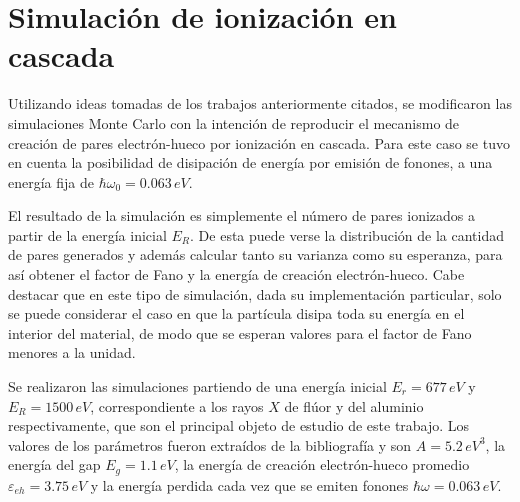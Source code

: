 \section{Simulación de ionización en cascada}
\noindent Utilizando ideas tomadas de los trabajos anteriormente citados, se modificaron las simulaciones Monte Carlo con la intención de reproducir el mecanismo de creación de pares electrón-hueco por ionización en cascada. Para este caso se tuvo en cuenta la posibilidad de disipación de energía por emisión de fonones, a una energía fija de $\hbar\omega_{0} = 0.063\,\si{eV}$.

El resultado de la simulación es simplemente el número de pares 
ionizados a partir de la energía inicial $E_{R}$. De esta puede verse la distribución de la cantidad de pares generados y además calcular tanto su varianza como su esperanza, para así obtener el factor de Fano y la energía de creación electrón-hueco.
Cabe destacar que en este tipo de simulación, dada su implementación particular, solo se puede considerar el caso en que la partícula disipa toda su energía en el interior del material, de modo que se esperan valores para el factor de Fano menores a la unidad.

Se realizaron las simulaciones partiendo de una energía inicial $E_{r} = 677\,\si{eV}$ y $E_{R} = 1500\,\si{eV}$, correspondiente a los rayos $X$ de flúor y del aluminio respectivamente, que son el principal objeto de estudio de este trabajo. Los valores de los parámetros fueron extraídos de la bibliografía\cite{Alig, Ramanathan} y son $A = 5.2\,\si{eV}^{3}$, la energía del gap $E_{g} = 1.1\,\si{eV}$, la energía de creación electrón-hueco promedio $\varepsilon_{eh} = 3.75\,\si{eV}$ y la energía perdida cada vez que se emiten fonones $\hbar \omega = 0.063\,\si{eV}$.

